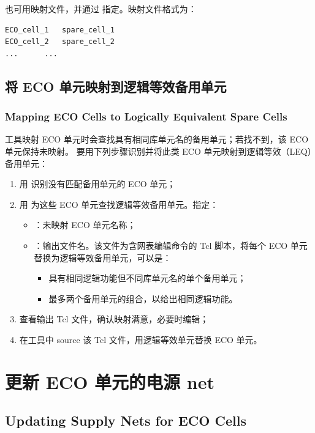 也可用映射文件，并通过  指定。映射文件格式为：
\begin{lstlisting}
ECO_cell_1   spare_cell_1
ECO_cell_2   spare_cell_2
...      ...
\end{lstlisting}

\subsection{将 ECO 单元映射到逻辑等效备用单元}
\subsubsection*{Mapping ECO Cells to Logically Equivalent Spare Cells}

工具映射 ECO 单元时会查找具有相同库单元名的备用单元；若找不到，该 ECO 单元保持未映射。
要用下列步骤识别并将此类 ECO 单元映射到逻辑等效（LEQ）备用单元：
\begin{enumerate}
  \item 用  识别没有匹配备用单元的 ECO 单元；
  \item 用  为这些 ECO 单元查找逻辑等效备用单元。指定：
  \begin{itemize}
    \item {}：未映射 ECO 单元名称；
    \item {}：输出文件名。该文件为含网表编辑命令的 Tcl 脚本，将每个 ECO 单元替换为逻辑等效备用单元，可以是：
    \begin{itemize}
      \item 具有相同逻辑功能但不同库单元名的单个备用单元；
      \item 最多两个备用单元的组合，以给出相同逻辑功能。
    \end{itemize}
  \end{itemize}
  \item 查看输出 Tcl 文件，确认映射满意，必要时编辑；
  \item 在工具中 source 该 Tcl 文件，用逻辑等效单元替换 ECO 单元。
\end{enumerate}

\section{更新 ECO 单元的电源 net}
\subsection*{Updating Supply Nets for ECO Cells}

